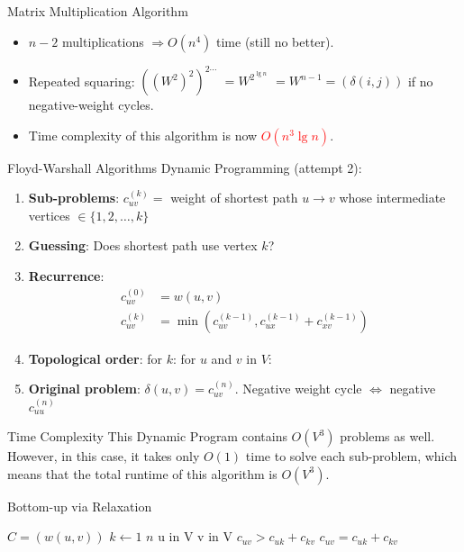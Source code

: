 \documentclass{beamer}
\begin{document}
\begin{frame}{Matrix Multiplication Algorithm}
    \begin{itemize}
        \item $n - 2$ multiplications $\Rightarrow O(n^4)$ time (still no better). \pause
        \item Repeated squaring: $((W^2)^2)^{2 \cdots}$ \pause $= W^{2^{\lg n}}$ \pause $= W^{n - 1} = (\delta(i, j))$ if no negative-weight cycles. \pause
        \item Time complexity of this algorithm is now \textcolor{red}{$O(n^3 \lg n)$}.
    \end{itemize}
\end{frame}


\begin{frame}{Floyd-Warshall Algorithms}
    Dynamic Programming (attempt 2):
    \begin{enumerate}
        \item \textbf{Sub-problems}: $c_{uv}^{(k)} =$ weight of shortest path $u \rightarrow v$ whose intermediate vertices $\in \{1,2, \ldots, k\}$ \pause
        \item \textbf{Guessing}:  \pause Does shortest path use vertex $k$? \pause
        \item \textbf{Recurrence}:
        \begin{equation*}
            \begin{align*}
                c_{uv}^{(0)} &= w(u, v) \\
                c_{uv}^{(k)} &= \min(c_{uv}^{(k-1)}, c_{ux}^{(k-1)} + c_{xv}^{(k-1)})
            \end{align*}
        \end{equation*}  \pause
        \item \textbf{Topological order}: for $k$: for $u$ and $v$ in $V$:
        \item \textbf{Original problem}: $\delta(u, v) = c_{uv}^{(n)}$. Negative weight cycle $\Leftrightarrow$ negative $c_{uu}^{(n)}$
    \end{enumerate}
\end{frame}

\begin{frame}{Time Complexity}
    This Dynamic Program contains $O(V^3)$ problems as well. However, in this case, it takes only $O(1)$ time to solve each sub-problem, which means that the total runtime of this algorithm is $O(V^3)$.
\end{frame}

\begin{frame}{Bottom-up via Relaxation}
    \begin{codebox}
        \li $C = (w(u, v))$
        \li \For $k \gets 1$ \To $n$
        \li \hspace{0.5cm} \For u in V
        \li \hspace{1.0cm} \For v in V
        \li \hspace{1.5cm} \If $c_{uv} > c_{uk} + c_{kv}$
        \li \hspace{2.0cm} $c_{uv} = c_{uk} + c_{kv}$
    \end{codebox}
\end{frame}
\end{document}
